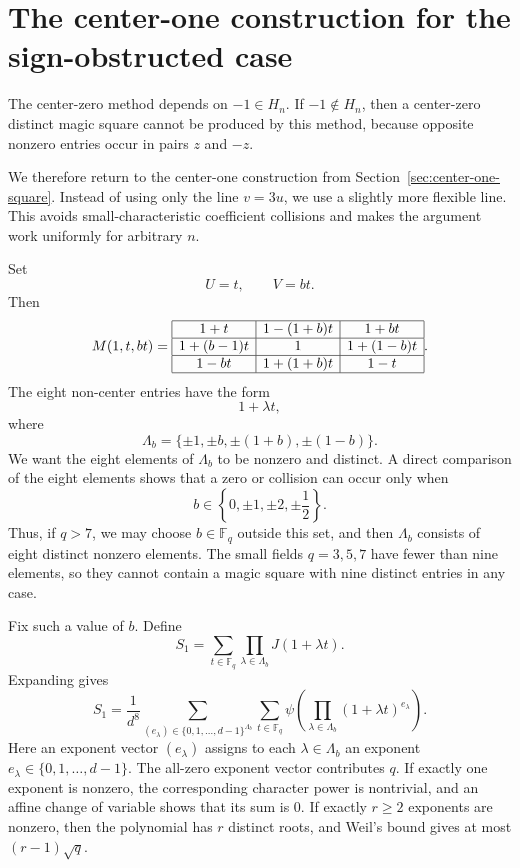 \documentclass{article}
\newcommand{\F}{\mathbb F}
\theoremstyle{definition}
\numberwithin{equation}{section}
\begin{document}
\section{The center-one construction for the sign-obstructed case}

The center-zero method depends on \(-1\in H_n\).  If \(-1\notin H_n\), then a
center-zero distinct magic square cannot be produced by this method, because
opposite nonzero entries occur in pairs \(z\) and \(-z\).

We therefore return to the center-one construction from Section~\ref{sec:center-one-square}.  Instead of
using only the line \(v=3u\), we use a slightly more flexible line.  This avoids
small-characteristic coefficient collisions and makes the argument work uniformly
for arbitrary \(n\).

Set
\[
U=t,
\qquad
V=bt.
\]
Then
\[
M(1,t,bt)=
\begin{array}{|c|c|c|}
\hline
1+t & 1-(1+b)t & 1+bt\\
\hline
1+(b-1)t & 1 & 1+(1-b)t\\
\hline
1-bt & 1+(1+b)t & 1-t \\
\hline
\end{array}.
\]
The eight non-center entries have the form
\[
1+\lambda t,
\]
where
\[
\Lambda_b=\{\pm1,\pm b,\pm(1+b),\pm(1-b)\}.
\]
We want the eight elements of \(\Lambda_b\) to be nonzero and distinct.
A direct comparison of the eight elements shows that a zero or collision can
occur only when
\[
b\in\left\{0,\pm1,\pm2,\pm\frac12\right\}.
\]
Thus, if \(q>7\), we may choose \(b\in\F_q\) outside this set, and then
\(\Lambda_b\) consists of eight distinct nonzero elements.  The small fields
\(q=3,5,7\) have fewer than nine elements, so they cannot contain a magic square
with nine distinct entries in any case.

Fix such a value of \(b\).  Define
\[
S_1=\sum_{t\in\F_q}\prod_{\lambda\in\Lambda_b}J(1+\lambda t).
\]
Expanding gives
\[
S_1
=
\frac{1}{d^8}
\sum_{(e_\lambda)\in\{0,1,\dots,d-1\}^{\Lambda_b}}
\sum_{t\in\F_q}
\psi\!\left(
\prod_{\lambda\in\Lambda_b}(1+\lambda t)^{e_\lambda}
\right).
\]
Here an exponent vector \((e_\lambda)\) assigns to each
\(\lambda\in\Lambda_b\) an exponent \(e_\lambda\in\{0,1,\dots,d-1\}\).
The all-zero exponent vector contributes \(q\).  If exactly one exponent is
nonzero, the corresponding character power is nontrivial, and an affine
change of variable shows that its sum is \(0\).  If
exactly \(r\geq 2\) exponents are nonzero, then the polynomial has \(r\) distinct
roots, and Weil's bound gives at most \((r-1)\sqrt q\).
\end{document}
